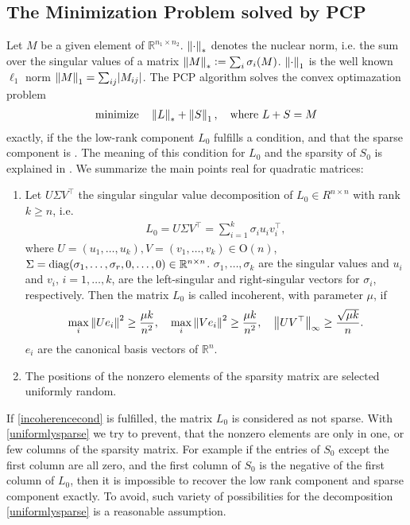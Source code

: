 \subsection{The Minimization Problem solved by PCP}\label{sec:pcp}
Let $M$ be a given element of $\mathbb R^{n_1\times n_2}$. $\left\Vert\cdot\right\Vert_*$ denotes the nuclear norm, i.e. the sum over the singular values of a matrix $\left\Vert M\right\Vert_* \vcentcolon= \sum_i \sigma_i(M)$. $\left\Vert\cdot\right\Vert_1$ is the well known $\ell_1$ norm $\left\Vert M\right\Vert_1 = \sum_{ij} \lvert M_{ij} \rvert$. The PCP algorithm solves the convex optimazation problem
\begin{align}
 \mathrm{minimize} \quad \left\Vert L\right\Vert_* + \left\Vert S\right\Vert_1, \quad \text{where } L+S=M
\end{align}
exactly, if the the low-rank component $L_0$ fulfills a  condition, and that the sparse component is . The meaning of this  condition for $L_0$ and the  sparsity of $S_0$ is explained in \cite[section 1.3]{candes2009robust}. We summarize the main points real for quadratic matrices:
\par
\begin{enumerate}[label=(\roman*),ref=(\roman*)]
 \item \label{incoherencecond} Let $U\Sigma V^\top$ the singular singular value decomposition of $L_0 \in R^{n\times n}$ with rank $k\ge n$, i.e.
\begin{align}
 L_0 = U\Sigma V^\top = \sum_{i=1}^k \sigma_i u_i v_i^\top,
\end{align}
where $U=(u_1,\dots,u_k),V=(v_1,\dots,v_k) \in \mathrm{O}(n)$, $\Sigma=\mathrm{diag}(\sigma_1,\dots,\sigma_r,0,\dots,0) \in \mathbb R^{n\times n}$. $\sigma_1,\dots,\sigma_k$ are the singular values and $u_i$ and $v_i$, $i=1,\dots,k$, are the left-singular and right-singular vectors for $\sigma_i$, respectively. Then the matrix $L_0$ is called incoherent, with parameter $\mu$, if
\begin{align}
 \max_i \left\Vert U e_i\right\Vert^2 \ge \dfrac{\mu k}{n^2},\quad  \max_i \left\Vert V e_i\right\Vert^2 \ge \dfrac{\mu k}{n^2}, \quad \left\Vert UV^\top\right\Vert_\infty \ge \dfrac{\sqrt{\mu k}}{n}.
\end{align}
$e_i$ are the canonical basis vectors of $\mathbb R^n$. 
 \item \label{uniformlysparse} The positions of the nonzero elements of the sparsity matrix are selected uniformly random.
\end{enumerate}
If \ref{incoherencecond} is fulfilled, the matrix $L_0$ is considered as not sparse. With \ref{uniformlysparse} we try to prevent, that the nonzero elements are only in one, or few columns of the sparsity matrix. For example if the entries of $S_0$ except the first column are all zero, and the first column of $S_0$ is the negative of the first column of $L_0$, then it is impossible to recover the low rank component and sparse component exactly. To avoid, such variety of possibilities for the decomposition 
\ref{uniformlysparse} is a reasonable assumption.

